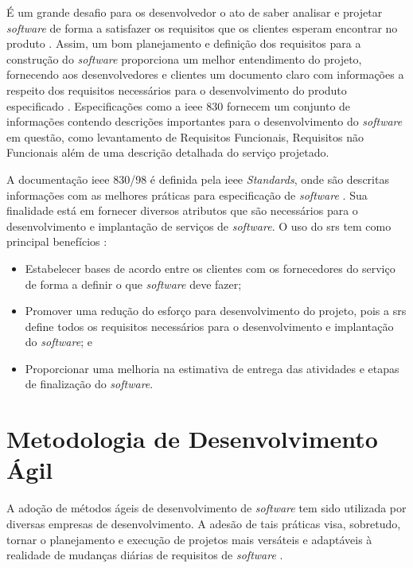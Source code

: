 \noindent É um grande desafio para os desenvolvedor o ato de saber analisar e projetar \textit{software} de forma a satisfazer os requisitos que os clientes esperam encontrar no produto \cite{pressmanengenharia}. Assim, um bom planejamento e definição dos requisitos para a construção do \textit{software} proporciona um melhor entendimento do projeto, fornecendo aos desenvolvedores e clientes um documento claro com informações a respeito dos requisitos necessários para o desenvolvimento do produto especificado \cite{pressmanengenharia}. 
Especificações como a \gls{ieee} 830 \cite{ieee1998ieee} fornecem um conjunto de informações contendo descrições importantes para o desenvolvimento do \textit{software} em questão, como levantamento de Requisitos Funcionais, Requisitos não Funcionais além de uma descrição detalhada do serviço projetado.

A documentação \acrshort{ieee} 830/98 é definida pela \acrshort{ieee} \textit{Standards}, onde são descritas informações com as melhores práticas para especificação de \textit{software} \cite{ieee1998ieee}.  Sua finalidade está em fornecer diversos atributos que são necessários para o desenvolvimento e implantação de serviços de \textit{software}. O uso do \gls{srs} tem como principal benefícios \cite{ieee1998ieee}:

\begin{itemize}
    \item Estabelecer bases de acordo entre os clientes com os fornecedores do serviço de forma a definir o que \textit{software} deve fazer;
    \item Promover uma redução do esforço para desenvolvimento do projeto, pois a \acrshort{srs} define todos os requisitos necessários para o desenvolvimento e implantação do \textit{software}; e
    \item Proporcionar uma melhoria na estimativa de entrega das atividades e etapas de finalização do \textit{software}.
\end{itemize}

\section{Metodologia de Desenvolvimento Ágil}

\noindent A adoção de métodos ágeis de desenvolvimento de \textit{software} tem sido utilizada por diversas empresas de desenvolvimento. A adesão de tais práticas visa, sobretudo, tornar o planejamento e execução de projetos mais versáteis e adaptáveis à realidade de mudanças diárias de requisitos de \textit{software} \cite{pressmanengenharia, rubin2012essential}.


